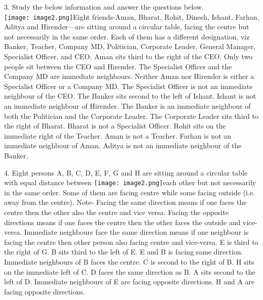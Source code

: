 \documentclass[
]{article}
\begin{document}
3. Study the below information and answer the questions below.\\
\texttt{[image: image2.png]}Eight friends-Aman, Bharat, Rohit, Dinesh, Ishant, Farhan, Aditya and Hirender—are
sitting around a circular table, facing the centre but not necessarily in the same order. Each
of them has a different designation, viz Banker, Teacher, Company MD, Politician,
Corporate Leader, General Manager, Specialist Officer, and CEO. Aman sits third to the
right of the CEO. Only two people sit between the CEO and Hirender. The Specialist Officer
and the Company MD are immediate neighbours. Neither Aman nor Hirender is either a
Specialist Officer or a Company MD. The Specialist Officer is not an immediate neighbour of
the CEO. The Banker sits second to the left of Ishant. Ishant is not an immediate neighbour
of Hirender. The Banker is an immediate neighbour of both the Politician and the Corporate
Leader. The Corporate Leader sits third to the right of Bharat. Bharat is not a Specialist
Officer. Rohit sits on the immediate right of the Teacher. Aman is not a Teacher. Farhan is
not an immediate neighbour of Aman. Aditya is not an immediate neighbour of the Banker.

4. Eight persons A, B, C, D, E, F, G and H are sitting around a circular table with equal
distance between \texttt{[image: image2.png]}each other but not necessarily in the same order. Some of them are facing
centre while some facing outside (i.e. away from the centre). Note- Facing the same direction
means if one faces the centre then the other also the centre and vice versa. Facing the opposite directions means if one faces the centre then the other faces the outside and vice-
versa. Immediate neighbours face the same direction means if one neighbour is facing the centre then other person also facing centre and vice-versa. E is third to the right of G. B sits
third to the left of E. E and B is facing same direction. Immediate neighbours of B faces the
centre. C is second to the right of B. H sits on the immediate left of C. D faces the same
direction as B. A sits second to the left of D. Immediate neighbours of E are facing opposite
directions. H and A are facing opposite directions.\\
\end{document}
